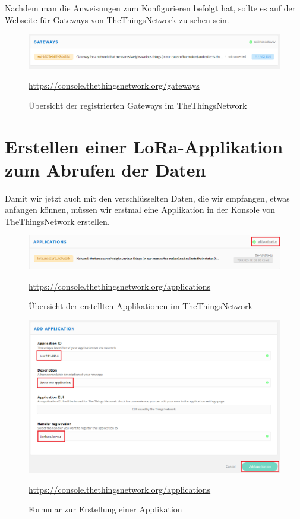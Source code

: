 Nachdem man die Anweisungen zum Konfigurieren befolgt hat, sollte es auf der Webseite für Gateways von TheThingsNetwork zu sehen sein.
\begin{figure}[H]
    \center
    \includegraphics[width=16cm]{Bilder/lora-1.png}\\
    \caption{Übersicht der registrierten Gateways im TheThingsNetwork}
    \begin{center} \quelle\url{https://console.thethingsnetwork.org/gateways} \end{center}
\end{figure}
\newpage
\section{Erstellen einer LoRa-Applikation zum Abrufen der Daten}
Damit wir jetzt auch mit den verschlüsselten Daten, die wir empfangen, etwas anfangen können, müssen wir erstmal eine Applikation in der Konsole von TheThingsNetwork erstellen. 
\begin{figure}[H]
    \center
    \includegraphics[width=16cm]{Bilder/lora-2.png}\\
    \caption{Übersicht der erstellten Applikationen im TheThingsNetwork}
    \begin{center} \quelle\url{https://console.thethingsnetwork.org/applications} \end{center}
\end{figure}
\begin{figure}[H]
    \center
    \includegraphics[width=16cm]{Bilder/lora-3.png}\\
    \caption{Formular zur Erstellung einer Applikation}
    \begin{center} \quelle\url{https://console.thethingsnetwork.org/applications} \end{center}
\end{figure}
\newpage
